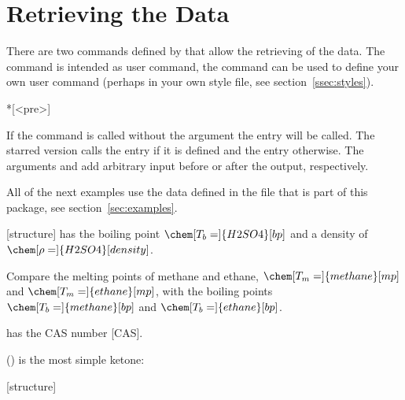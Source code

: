 \documentclass[DIV10,toc=index,toc=bib]{cnpkgdoc}
\begin{document}
\section{Retrieving the Data}
There are two commands defined by \substances that allow the retrieving of the
data. The command  is intended as user command, the command
 can be used to define your own user command (perhaps
in your own style file, see section~\ref{ssec:styles}).
\begin{beschreibung}
 *[<pre>]
\end{beschreibung}
If the command  is called without the  argument the
 entry will be called. The starred version calls the  entry
if it is defined and the  entry otherwise. The arguments 
and  add arbitrary input before or after the output, respectively.

All of the next examples use the data defined in the file 
that is part of this package, see section~\ref{sec:examples}.
\begin{beispiel}
 [structure] \newline
  has the boiling point \(\chem[T_b =]{H2SO4}[bp]\) and a
 density of \(\chem[\rho =]{H2SO4}[density]\).

 Compare the melting points of methane and ethane,
 \(\chem[T_m=]{methane}[mp]\) and \(\chem[T_m=]{ethane}[mp]\),
 with the boiling points \(\chem[T_b=]{methane}[bp]\) and
 \(\chem[T_b=]{ethane}[bp]\).
 
  has the \ac{CAS} number [CAS].
 
  () is the most simple ketone:
 
 [structure]
\end{beispiel}
\end{document}
